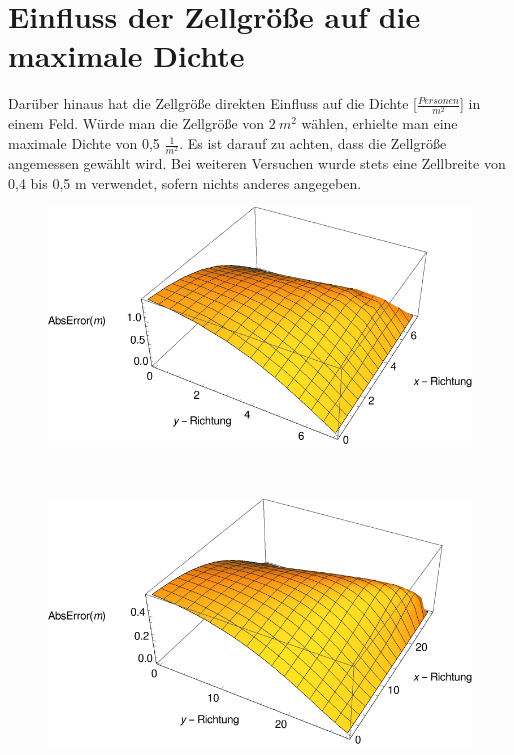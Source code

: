 \section{Einfluss der Zellgröße auf die maximale Dichte}
Darüber hinaus hat die Zellgröße direkten Einfluss auf die Dichte [$\frac{Personen}{m^2}$] in einem Feld. Würde man die Zellgröße von $2\ m^2$ wählen, erhielte man eine maximale Dichte von 0,5 $\frac{1}{m^2}$. Es ist darauf zu achten, dass die Zellgröße angemessen gewählt wird. Bei weiteren Versuchen wurde stets eine Zellbreite von 0,4 bis 0,5 m verwendet, sofern nichts anderes angegeben.



\begin{figure}
\centering
\begin{minipage}{.8\textwidth}
\centering
  \includegraphics[width=1\linewidth]{abbildungen/vergleich_euklid_fast_marching/3DVergleich/cellsize2/Error.pdf}
\end{minipage}%
\\
\begin{minipage}{.8\textwidth}
\centering
  \includegraphics[width=1\linewidth]{abbildungen/vergleich_euklid_fast_marching/3DVergleich/cellsize0_5/Error.pdf}

\end{minipage}
\end{figure}
